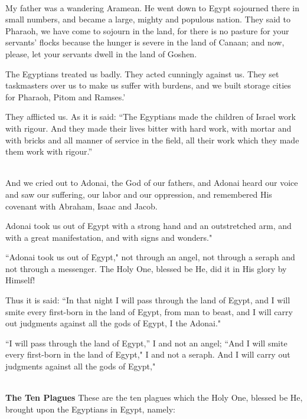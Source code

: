 \documentclass[a4paper,12pt,openany]{memoir}
\newcommand{\HgInst}[1]{{\noindent\sffamily{\bfseries{#1}}}}
\newenvironment{HgEnglish}{\strut\\\noindent}{\vspace{1em}}
\begin{document}
\begin{HgEnglish}
My father was a wandering Aramean. He went down to Egypt sojourned
there in small numbers, and became a large, mighty and populous
nation. They said to Pharaoh, we have come to sojourn in the land, for
there is no pasture for your servants' flocks because the hunger is
severe in the land of Canaan; and now, please, let your servants dwell
in the land of Goshen.

The Egyptians treated us badly. They acted cunningly against us. They
set taskmasters over us to make us suffer with burdens, and we built
storage cities for Pharaoh, Pitom and Ramses.'

They afflicted us. As it is said: ``The Egyptians made the children of Israel work with rigour. And they made their lives bitter with hard work, with mortar and with bricks and all manner of service in the field, all their work which they made them work with rigour.''
\end{HgEnglish}

\HgInst{Continue}
\begin{HgEnglish}
And we cried out to Adonai, the God of our fathers, and Adonai heard
our voice and saw our suffering, our labor and our oppression, and
remembered His covenant with Abraham, Isaac and Jacob.

Adonai took us out of Egypt with a strong hand and an outstretched
arm, and with a great manifestation, and with signs and wonders."

``Adonai took us out of Egypt," not through an angel, not through a
seraph and not through a messenger. The Holy One, blessed be He, did
it in His glory by Himself!

Thus it is said: ``In that night I will pass through the land of Egypt,
and I will smite every first-born in the land of Egypt, from man to
beast, and I will carry out judgments against all the gods of Egypt, I
the Adonai."

``I will pass through the land of Egypt,'' I and not an angel; ``And I
will smite every first-born in the land of Egypt," I and not a
seraph. And I will carry out judgments against all the gods of Egypt," 
\end{HgEnglish}

\newpage


\begin{HgEnglish}
\textbf{The Ten Plagues} These are the ten plagues which the Holy One, blessed be He, brought
upon the Egyptians in Egypt, namely:
\end{HgEnglish}
\end{document}
